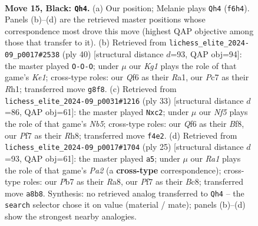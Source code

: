 \documentclass[11pt]{article}
\begin{document}
\clearpage

\begin{figure}[p]\centering
\begin{subfigure}{0.46\textwidth}\centering
\resizebox{\linewidth}{!}{%
\newchessgame
\chessboard[
  setfen={r1br2k1/ppp2p1p/3p1qp1/4b3/N1P1Pn2/7P/PP1QBPP1/R1B2R1K b - - 10 15},
  showmover=false,
  pgfstyle=straightmove, color=movearrow, markmove={f6-h4}
]}
\caption{}
\end{subfigure}\hfill
\begin{subfigure}{0.46\textwidth}\centering
\resizebox{\linewidth}{!}{%
\newchessgame
\chessboard[
  setfen={r1bq1rk1/pp2ppbp/2p3p1/4N2n/3P4/P1QB2B1/1PP2PPP/R3K2R w KQ - 9 21},
  showmover=false,
  pgfstyle=straightmove, color=movearrow, markmove={e1-c1}
]}
\caption{}
\end{subfigure}
\\[4pt]
\begin{subfigure}{0.46\textwidth}\centering
\resizebox{\linewidth}{!}{%
\newchessgame
\chessboard[
  setfen={r3kb1r/2pq1pp1/3p2b1/1p4Pp/1n2PP2/7P/PPB4K/RNBQ1R2 b kq - 0 17},
  showmover=false,
  pgfstyle=straightmove, color=movearrow, markmove={b4-c2}
]}
\caption{}
\end{subfigure}\hfill
\begin{subfigure}{0.46\textwidth}\centering
\resizebox{\linewidth}{!}{%
\newchessgame
\chessboard[
  setfen={r1b2rk1/p2p1ppp/1qp1p3/4P3/1bP1NP2/3Qn3/PP1B2PP/2R1KB1R b K - 6 13},
  showmover=false,
  pgfstyle=straightmove, color=movearrow, markmove={a7-a5}
]}
\caption{}
\end{subfigure}
\caption{\textbf{Move 15, Black: \texttt{Qh4}.} (a) Our position; Melanie plays \texttt{Qh4} (\texttt{f6h4}). Panels (b)--(d) are the retrieved master positions whose correspondence most drove this move (highest QAP objective among those that transfer to it). (b) Retrieved from \texttt{lichess\_elite\_2024-09\_p0017\#2538} (ply 40) [structural distance $d$=93, QAP obj=94]: the master played \texttt{O-O-O}; under $\mu$ our \emph{Kg1} plays the role of that game's \emph{Ke1}; cross-type roles: our \emph{Q}f6 as their \emph{R}a1, our \emph{P}c7 as their \emph{R}h1; transferred move \texttt{g8f8}. (c) Retrieved from \texttt{lichess\_elite\_2024-09\_p0031\#1216} (ply 33) [structural distance $d$=86, QAP obj=61]: the master played \texttt{Nxc2}; under $\mu$ our \emph{Nf5} plays the role of that game's \emph{Nb5}; cross-type roles: our \emph{Q}f6 as their \emph{B}f8, our \emph{P}f7 as their \emph{R}h8; transferred move \texttt{f4e2}. (d) Retrieved from \texttt{lichess\_elite\_2024-09\_p0017\#1704} (ply 25) [structural distance $d$=93, QAP obj=61]: the master played \texttt{a5}; under $\mu$ our \emph{Ra1} plays the role of that game's \emph{Pa2} (a \textbf{cross-type} correspondence); cross-type roles: our \emph{P}b7 as their \emph{R}a8, our \emph{P}f7 as their \emph{B}c8; transferred move \texttt{a8b8}. Synthesis: no retrieved analog transferred to \texttt{Qh4} -- the \texttt{search} selector chose it on value (material / mate); panels (b)--(d) show the strongest nearby analogies.}
\label{fig:thought-m29}
\end{figure}
\end{document}
